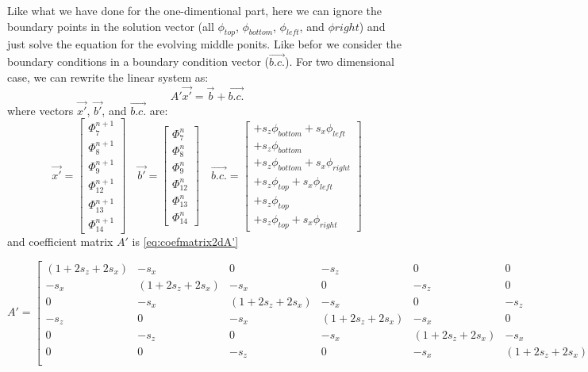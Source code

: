 Like what we have done for the one-dimentional part, here we can ignore the boundary points in the solution vector (all $\phi_{top}$, $\phi_{bottom}$, $\phi_{left}$, and $\phi{right}$) and just solve the equation for the evolving middle ponits. Like befor we consider the boundary conditions in a boundary condition vector ($\vec{b.c.}$). For two dimensional case, we can rewrite the linear system as:
\begin{equation}
A'\vec{x'}=\vec{b}+\vec{b.c.}
\end{equation} 
where vectors $\vec{x'}$, $\vec{b'}$, and $\vec{b.c.}$ are:
\begin{equation}
\vec{x'}=\begin{bmatrix}
 \Phi^{n+1}_{7} \\ \Phi^{n+1}_{8} \\ \Phi^{n+1}_{9} \\  \Phi^{n+1}_{12} \\ \Phi^{n+1}_{13} \\ \Phi^{n+1}_{14}
\end{bmatrix}
\quad
\vec{b'}=\begin{bmatrix}
 \Phi^{n}_{7} \\ \Phi^{n}_{8} \\ \Phi^{n}_{9} \\  \Phi^{n}_{12} \\ \Phi^{n}_{13} \\ \Phi^{n}_{14}
\end{bmatrix}
\quad
\vec{b.c.}= \begin{bmatrix}
+s_{z} \phi_{bottom} +s_{x} \phi_{left} \\ +s_{z} \phi_{bottom} \\ +s_{z} \phi_{bottom} + s_{x} \phi_{right}  \\ +s_{z} \phi_{top} + s_{x} \phi_{left} \\ +s_{z} \phi_{top} \\ +s_{z} \phi_{top} + s_{x} \phi_{right}
\end{bmatrix}
\end{equation}
and coefficient matrix $A'$ is \ref{eq:coefmatrix2dA'}

\begin{table}[ht]
\begin{equation}
A' = \begin{bmatrix}
	   (1+2s_z +2 s_x) & -s_x & 0 & -s_z & 0 & 0  \\
   	   -s_x & (1+2s_z +2 s_x) &-s_x & 0 & -s_z & 0   \\
   	   0 & -s_x & (1+2s_z +2 s_x) &-s_x & 0 & -s_z   \\
  	   -s_z & 0 & -s_x & (1+2s_z +2 s_x) &-s_x & 0   \\
   	   0 & -s_z & 0 & -s_x & (1+2s_z +2 s_x) &-s_x  \\
   	   0 & 0 & -s_z & 0 & -s_x & (1+2s_z +2 s_x)  \\
     \end{bmatrix}
     \label{eq:coefmatrix2dA'}
\end{equation}
\end{table}


